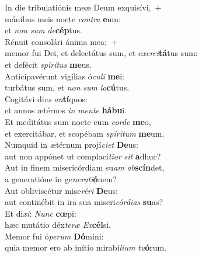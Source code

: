 \evenverse In die tribulatiónis meæ Deum exquisívi,~+\\\evenverse  mánibus meis nocte \textit{con}\textit{tra} \textbf{e}um:~\*\\
\evenverse et \textit{non} \textit{sum} \textit{de}\textbf{cép}tus.\\
\oddverse Rénuit consolári ánima mea:~+\\
\oddverse  memor fui Dei, et delectátus sum, et e\textit{xer}\textit{ci}\textbf{tá}tus sum:~\*\\
\oddverse et defécit \textit{spí}\textit{ri}\textit{tus} \textbf{me}us.\\
\evenverse Anticipavérunt vigílias ó\textit{cu}\textit{li} \textbf{me}i:~\*\\
\evenverse turbátus sum, et \textit{non} \textit{sum} \textit{lo}\textbf{cú}tus.\\
\oddverse Cogitávi di\textit{es} \textit{an}\textbf{tí}quos:~\*\\
\oddverse et annos ætérnos \textit{in} \textit{men}\textit{te} \textbf{há}\textbf{bu}i.\\
\evenverse Et meditátus sum nocte cum \textit{cor}\textit{de} \textbf{me}o,~\*\\
\evenverse et exercitábar, et scopébam \textit{spí}\textit{ri}\textit{tum} \textbf{me}um.\\
\oddverse Numquid in ætérnum projí\textit{ci}\textit{et} \textbf{De}us:~\*\\
\oddverse aut non appónet ut complací\textit{ti}\textit{or} \textit{sit} \textbf{a}dhuc?\\
\evenverse Aut in finem misericórdiam su\textit{am} \textit{ab}\textbf{scín}det,~\*\\
\evenverse a generatióne in ge\textit{ne}\textit{ra}\textit{ti}\textbf{ó}nem?\\
\oddverse Aut obliviscétur mise\textit{ré}\textit{ri} \textbf{De}us:~\*\\
\oddverse aut continébit in ira sua miseri\textit{cór}\textit{di}\textit{as} \textbf{su}as?\\
\evenverse Et di\textit{xi}: \textit{Nunc} \textbf{cœ}pi:~\*\\
\evenverse hæc mutátio déx\textit{te}\textit{ræ} \textit{Ex}\textbf{cél}si.\\
\oddverse Memor fui ó\textit{pe}\textit{rum} \textbf{Dó}mini:~\*\\
\oddverse quia memor ero ab inítio mirabí\textit{li}\textit{um} \textit{tu}\textbf{ó}rum.\\

